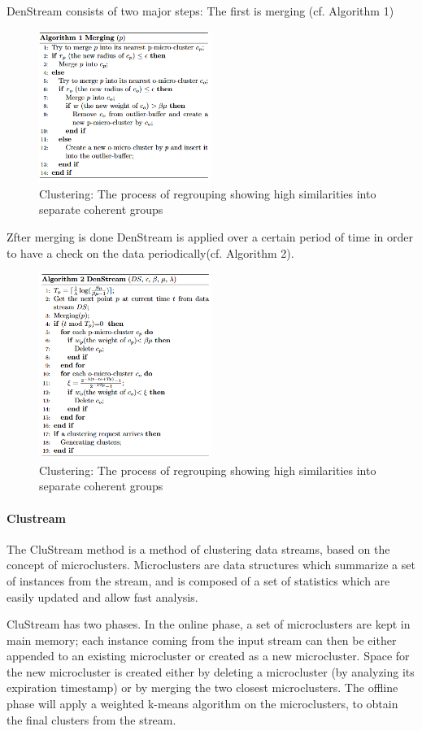 \documentclass[]{article}
\begin{document}
DenStream consists of two major steps: The first is merging (cf. Algorithm 1)
\begin{figure}[h!]
	\centering
	\includegraphics[width=0.5\textwidth]{merging.png}
	\caption{Clustering: The process of regrouping showing high similarities into separate coherent groups}
\end{figure} 

Zfter merging is done DenStream is applied over a certain period of time in order to have a check on the data periodically(cf. Algorithm 2).

\begin{figure}[h!]
	\centering
	\includegraphics[width=0.5\textwidth]{DenStream.png}
	\caption{Clustering: The process of regrouping showing high similarities into separate coherent groups}
\end{figure} 

\paragraph{Clustream}

The CluStream method is a method of clustering data streams, based on the concept of microclusters. Microclusters are data structures which summarize a set of instances from the stream, and is composed of a set of statistics which are easily updated and allow fast analysis. 

CluStream has two phases. In the online phase, a set of microclusters are kept in main memory; each instance coming from the input stream can then be either appended to an existing microcluster or created as a new microcluster. Space for the new microcluster is created either by deleting a microcluster (by analyzing its expiration timestamp) or by merging the two closest microclusters. The offline phase will apply a weighted k-means algorithm on the microclusters, to obtain the final clusters from the stream\cite{ClustreamDefinition}.




\end{document}
